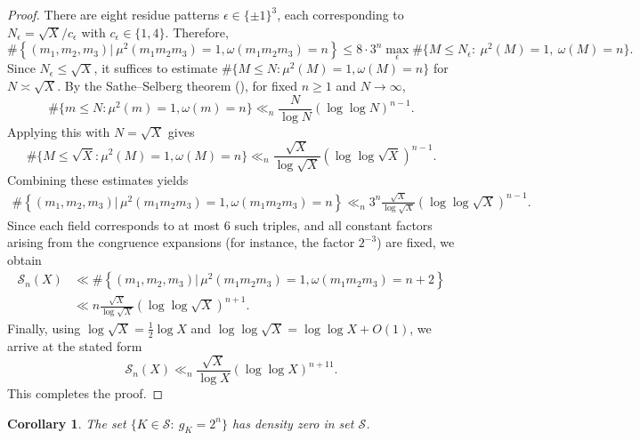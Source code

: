 \documentclass[12 pt]{amsart}
\newcommand{\cS}{\mathcal{S}}
\newtheorem{cor}[thm]{Corollary}
\theoremstyle{definition}
\theoremstyle{remark}
\begin{document}
\begin{proof}
    \noindent
	There are eight residue patterns $\epsilon\in\{\pm1\}^3$, each corresponding to
	$N_\epsilon=\sqrt X/c_\epsilon$ with $c_\epsilon\in\{1,4\}$.  
	Therefore,
	\[
	\#\left\{(m_1,m_2,m_3) \big\vert \ \mu^2(m_1m_2m_3)=1,\omega(m_1m_2m_3)=n\right\}
	\le 8\cdot 3^n\max_{\epsilon}\#\{M\le N_\epsilon:\ \mu^2(M)=1,\ \omega(M)=n\}.
	\]
	Since $N_\epsilon\le\sqrt X$, it suffices to estimate
	$\#\{M\le N:\mu^2(M)=1,\omega(M)=n\}$ for $N\asymp\sqrt X$. By the Sathe--Selberg theorem (), for fixed $n\ge1$ and $N\to\infty$,
	\[
	\#\{m\le N:\mu^2(m)=1,\omega(m)=n\}
	\ll_n \frac{N}{\log N}(\log\log N)^{n-1}.
	\]
	Applying this with $N=\sqrt X$ gives
	\[
	\#\{M\le\sqrt X:\mu^2(M)=1,\omega(M)=n\}
	\ll_n \frac{\sqrt X}{\log\sqrt X}(\log\log\sqrt X)^{n-1}.
	\]
	Combining these estimates yields
\begin{align*}
	\#\left\{(m_1,m_2,m_3) \big\vert \,  \mu^2(m_1m_2m_3)=1,\omega(m_1m_2m_3)=n\right\}
\ll_n 3^n\frac{\sqrt X}{\log\sqrt X}(\log\log\sqrt X)^{n-1}.
\end{align*}
	Since each field corresponds to at most $6$ such triples, and all constant factors
	arising from the congruence expansions (for instance, the factor $2^{-3}$) are fixed,
	we obtain
\begin{align*}
		\cS_n(X)&\ll \#\left\{(m_1,m_2,m_3) \big\vert \,  \mu^2(m_1m_2m_3)=1,\omega(m_1m_2m_3)=n+2\right\} \\
	&\ll  n \frac{\sqrt X}{\log\sqrt X}(\log\log\sqrt X)^{n+1}.
\end{align*}
	Finally, using $\log\sqrt X=\tfrac12\log X$ and
	$\log\log\sqrt X=\log\log X + O(1)$, we arrive at the stated form
	\[
		\cS_n(X)\ll_n \frac{\sqrt X}{\log X}(\log\log X)^{n+11}.
	\]
	This completes the proof.
\end{proof}

\begin{cor}
	The set $\{K\in\cS:\  g_K=2^{n}\}$ has density zero in set $\cS$. 
\end{cor}
\end{document}
